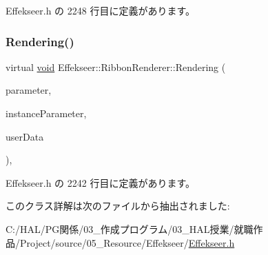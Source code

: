  Effekseer.\+h の 2248 行目に定義があります。

\mbox{\label{class_effekseer_1_1_ribbon_renderer_a3d1991348eeba97aa02c8082455edd39}} 
\subsubsection{\texorpdfstring{Rendering()}{Rendering()}}
{\footnotesize\ttfamily virtual \mbox{\hyperlink{namespace_effekseer_ab34c4088e512200cf4c2716f168deb56}{void}} Effekseer\+::\+Ribbon\+Renderer\+::\+Rendering (\begin{DoxyParamCaption}\item[{const \mbox{\hyperlink{struct_effekseer_1_1_ribbon_renderer_1_1_node_parameter}{Node\+Parameter}} \&}]{parameter,  }\item[{const \mbox{\hyperlink{struct_effekseer_1_1_ribbon_renderer_1_1_instance_parameter}{Instance\+Parameter}} \&}]{instance\+Parameter,  }\item[{\mbox{\hyperlink{namespace_effekseer_ab34c4088e512200cf4c2716f168deb56}{void}} $\ast$}]{user\+Data }\end{DoxyParamCaption})\hspace{0.3cm}{\ttfamily [inline]}, {\ttfamily [virtual]}}



 Effekseer.\+h の 2242 行目に定義があります。



このクラス詳解は次のファイルから抽出されました\+:\begin{DoxyCompactItemize}
\item 
C\+:/\+H\+A\+L/\+P\+G関係/03\+\_\+作成プログラム/03\+\_\+\+H\+A\+L授業/就職作品/\+Project/source/05\+\_\+\+Resource/\+Effekseer/\mbox{\hyperlink{_effekseer_8h}{Effekseer.\+h}}\end{DoxyCompactItemize}
